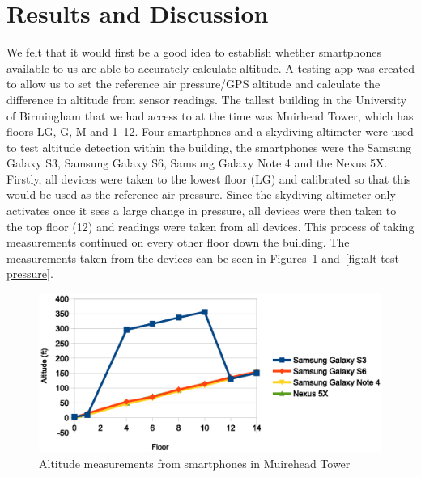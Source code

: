 \documentclass[11pt, a4paper, twocolumn]{article}
\begin{document}
\section{Results and Discussion}\label{sec:results-discussion} %

We felt that it would first be a good idea to establish whether smartphones available to us are able to accurately calculate altitude. A testing app was created to allow us to set the reference air pressure/GPS altitude and calculate the difference in altitude from sensor readings.
The tallest building in the University of Birmingham that we had access to at the time was Muirhead Tower, which has floors LG, G, M and 1--12. Four smartphones and a skydiving altimeter were used to test altitude detection within the building, the smartphones were the Samsung Galaxy S3, Samsung Galaxy S6, Samsung Galaxy Note 4 and the Nexus 5X.
Firstly, all devices were taken to the lowest floor (LG) and calibrated so that this would be used as the reference air pressure. Since the skydiving altimeter only activates once it sees a large change in pressure, all devices were then taken to the top floor (12) and readings were taken from all devices. This process of taking measurements continued on every other floor down the building.
The measurements taken from the devices can be seen in Figures~\ref{fig:alt-test-altitude} and~\ref{fig:alt-test-pressure}.

\begin{figure}[h]
    \centering
    \includegraphics{alt-test-altitude}
    \caption{Altitude measurements from smartphones in Muirehead Tower}\label{fig:alt-test-altitude}
\end{figure}
\end{document}
